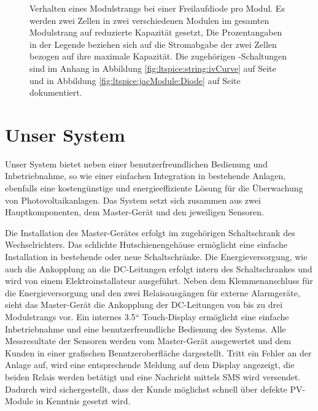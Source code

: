 \begin{figure}[h!tb]
    
    \caption[%
        IV- und PV-Kurven eines Modulsstrangs bei Leistungseinbruch,
        mit Freilaufdioden%
    ]
    {
        Verhalten   eines    Modulstrangs   bei   einer    Freilaufdiode   pro
        Modul. Es    werden     zwei    Zellen    in     zwei    verschiedenen
        Modulen   im   gesamten   Modulstrang   auf   reduzierte   Kapazit\"at
        gesetzt,   Die   Prozentangaben   in   der   Legende   beziehen   sich
        auf   die    Stromabgabe   der   zwei   Zellen    bezogen   auf   ihre
        maximale  Kapazit\"at. Die   zugeh\"origen  -Schaltungen
        sind   im   Anhang   in   Abbildung   \ref{fig:ltspice:string:ivCurve}
        auf     Seite      \pageref{fig:ltspice:string:ivCurve}     und     in
        Abbildung       \ref{fig:ltspice:jacModule:Diode}      auf       Seite
        \pageref{fig:ltspice:jacModule:Diode} dokumentiert.%
    }
    \label{fig:simu:iv-curves:array:generic:bypass}
\end{figure}


\clearpage
\section{Unser System}
\label{sec:ourSystem}

Unser   System  bietet   neben   einer   benutzerfreundlichen  Bedienung   und
Inbetriebnahme,  so wie  einer  einfachen Integration  in bestehende  Anlagen,
ebenfalls  eine  kosteng\"unstige  und energieeffiziente  L\"osung  f\"ur  die
\"Uberwachung von Photovoltaikanlagen. Das System setzt sich zusammen aus zwei
Hauptkomponenten, dem Master-Ger\"at und den jeweiligen Sensoren.

Die Installation  des Master-Ger\"ates erfolgt im  zugeh\"origen Schaltschrank
des  Wechselrichters. Das  schlichte  Hutschienengeh\"ause  erm\"oglicht  eine
einfache   Installation   in   bestehende  oder   neue   Schaltschr\"anke. Die
Energieversorgung,  wie  auch  die  Ankopplung  an  die  DC-Leitungen  erfolgt
intern   des   Schaltschrankes   und  wird   von   einem   Elektroinstallateur
ausgef\"uhrt. Neben dem  Klemmenanschluss f\"ur die Energieversorgung  und den
zwei Relaisausg\"angen  f\"ur externe Alarmger\"ate, sieht  das Master-Ger\"at
die  Ankopplung  der  DC-Leitungen  von  bis  zu  drei  Modulstrangs  vor. Ein
internes 3.5“ Touch-Display erm\"oglicht eine einfache Inbetriebnahme und eine
benutzerfreundliche  Bedienung des  Systems. Alle  Messresultate der  Sensoren
werden  vom Master-Ger\"at  ausgewertet  und dem  Kunden  in einer  grafischen
Benutzeroberfl\"ache  dargestellt. Tritt ein  Fehler an  der Anlage  auf, wird
eine entsprechende Meldung auf dem Display angezeigt, die beiden Relais werden
bet\"atigt  und  eine  Nachricht  mittels  SMS  wird  versendet. Dadurch  wird
sichergestellt, dass der Kunde m\"oglichst schnell \"uber defekte PV-Module in
Kenntnis gesetzt wird.

